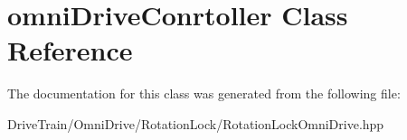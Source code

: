 \hypertarget{classomni_drive_conrtoller}{}\section{omni\+Drive\+Conrtoller Class Reference}
\label{classomni_drive_conrtoller}


The documentation for this class was generated from the following file\+:\begin{DoxyCompactItemize}
\item 
Drive\+Train/\+Omni\+Drive/\+Rotation\+Lock/Rotation\+Lock\+Omni\+Drive.\+hpp\end{DoxyCompactItemize}
